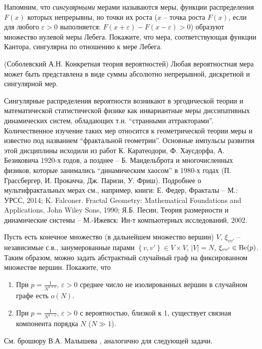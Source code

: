 \begin{problem}
Напомним, что \textit{сингулярными} мерами называются меры, функции распределения $F(x)$ которых непрерывны, но точки их роста ($x$ -- точка роста $F(x)$, если для любого $\varepsilon >0$ выполняется: $F(x+\varepsilon )-F(x-\varepsilon )>0$) образуют множество нулевой меры Лебега. Покажите, что мера, соответствующая функции Кантора, сингулярна по отношению к мере Лебега.

\end{problem}

\begin{remark} (Соболевский А.Н. Конкретная теория вероятностей)
Любая вероятностная мера может быть представлена в виде суммы абсолютно непрерывной, дискретной и сингулярной мер. 

Сингулярные распределения вероятности возникают в эргодической теории и математической статистической физике как инвариантные меры диссипативных динамических систем, обладающих т.н. ``странными аттракторами''. Количественное изучение таких мер относится к геометрической теории меры и известно под названием ``фрактальной геометрии''. Основные импульсы развития этой дисциплины исходили из работ К. Каратеодори, Ф. Хаусдорфа, А. Безиковича 1920-х годов, а позднее -- Б. Мандельброта и многочисленных физиков, которые занимались ``динамическим хаосом'' в 1980-х годах (П. Грассбергер, И. Прокачча, Дж. Паризи, У. Фриш). Подробнее о мультифрактальных мерах см., например, книги: Е. Федер, Фракталы -- М.: УРСС, 2014; K. Falconer. Fractal Geometry: Mathematical Foundations and Applications, John Wiley  Sons, 1990; Я.Б. Песин, Теория размерности и динамические системы -- М.-Ижевск: Ин-т компьютерных исследований, 2002.

\end{remark} 


\begin{problem}
\label{sec:erdRenyi}
 Пусть есть конечное множество (в дальнейшем множество вершин) $V$, $\xi _{vv'} $ -- независимые с.в., занумерованные парами $\left\{v,v'\right\}\in V\times V$, $\vert V \vert = N$, $\xi _{vv'} \in \mathrm{Be}(p)$. 
Таким образом, можно задать абстрактный случайный граф на фиксированном множестве вершин. Покажите, что 
 
\begin{enumerate}
\item  При $p=\frac{1}{N^{1+\varepsilon } } $, $\varepsilon >0$ среднее число не изолированных вершин в случайном графе есть $o\left(N\right)$.
 
\item  При $p=\frac{1}{N^{1-\varepsilon } } $, $\varepsilon >0$ с вероятностью, близкой к 1, существует связная компонента порядка $N$ ($N \gg 1$).
\end{enumerate}
\end{problem}
 \begin{remark}
 См. брошюру В.А. Малышева \cite{27}, аналогично для следующей задачи.
 \end{remark}
 
